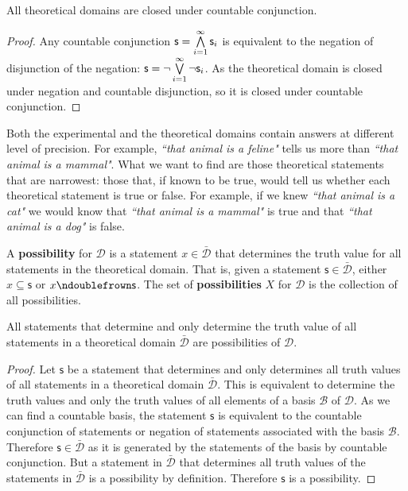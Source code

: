 \documentclass[11pt,letterpaper,fleqn]{memoir} %
\begin{document}
\begin{mathSection}
	\begin{prop}
		All theoretical domains are closed under countable conjunction.
	\end{prop}

\begin{proof}
	Any countable conjunction $\mathsf{s} = \bigwedge\limits_{i=1}^{\infty} \mathsf{s}_i$ is equivalent to the negation of disjunction of the negation: $\mathsf{s} = \neg\bigvee\limits_{i=1}^{\infty} \neg\mathsf{s}_i$. As the theoretical domain is closed under negation and countable disjunction, so it is closed under countable conjunction.  
\end{proof}

\end{mathSection}

Both the experimental and the theoretical domains contain answers at different level of precision. For example, \emph{``that animal is a feline"} tells us more than \emph{``that animal is a mammal"}. What we want to find are those theoretical statements that are narrowest: those that, if known to be true, would tell us whether each theoretical statement is true or false. For example, if we knew \emph{``that animal is a cat"} we would know that \emph{``that animal is a mammal"} is true and that \emph{``that animal is a dog"} is false.

\begin{mathSection}

\begin{defn}
	A \textbf{possibility} for $\mathcal{D}$ is a statement $x \in \bar{\mathcal{D}}$ that determines the truth value for all statements in the theoretical domain. That is, given a statement $\mathsf{s} \in \bar{\mathcal{D}}$, either $x \subseteq \mathsf{s}$ or $x \ncomp \mathsf{s}$. The set of \textbf{possibilities} $X$ for $\mathcal{D}$ is the collection of all possibilities.
\end{defn}

\begin{prop}
	All statements that determine and only determine the truth value of all statements in a theoretical domain $\bar{\mathcal{D}}$ are possibilities of $\mathcal{D}$.
\end{prop}

\begin{proof}
	Let $\mathsf{s}$ be a statement that determines and only determines all truth values of all statements in a theoretical domain $\bar{\mathcal{D}}$. This is equivalent to determine the truth values and only the truth values of all elements of a basis $\mathcal{B}$ of $\mathcal{D}$. As we can find a countable basis, the statement $\mathsf{s}$ is equivalent to the countable conjunction of statements or negation of statements associated with the basis $\mathcal{B}$. Therefore $\mathsf{s} \in \bar{\mathcal{D}}$ as it is generated by the statements of the basis by countable conjunction. But a statement in $\bar{\mathcal{D}}$ that determines all truth values of the statements in $\bar{\mathcal{D}}$ is a possibility by definition. Therefore $\mathsf{s}$ is a possibility.
\end{proof}
\end{mathSection}
\end{document}
